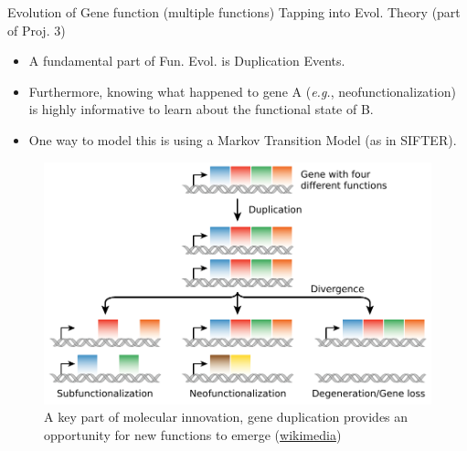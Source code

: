 \documentclass[10pt,aspectratio=169]{beamer}
\newcounter{frame}[frame]
\begin{document}
\begin{frame}{Evolution of Gene function (multiple functions)}
Tapping into Evol. Theory (part of Proj. 3)\\\bigskip

\begin{center}
\begin{minipage}{.44\linewidth}
\begin{itemize}[<+->]
    \item A fundamental part of Fun. Evol. is Duplication Events.
    \item Furthermore, knowing what happened to gene A (\textit{e.g.}, neofunctionalization) is highly informative to learn about the functional state of B.
    \item One way to model this is using a Markov Transition Model (as in SIFTER).
\end{itemize}
\end{minipage}
\begin{minipage}{.55\linewidth}
    \begin{figure}
    \centering
    \includegraphics[width=1\linewidth]{fig/Evolution_fate_duplicate_genes_-_vector.pdf}
    \caption{A key part of molecular innovation, gene duplication provides an opportunity for new functions to emerge (\href{https://en.wikipedia.org/wiki/File:Evolution_fate_duplicate_genes_-_vector.svg}{wikimedia})}
    \label{fig:duplication}
    \end{figure}
\end{minipage}
\end{center}

\end{frame}
\end{document}
